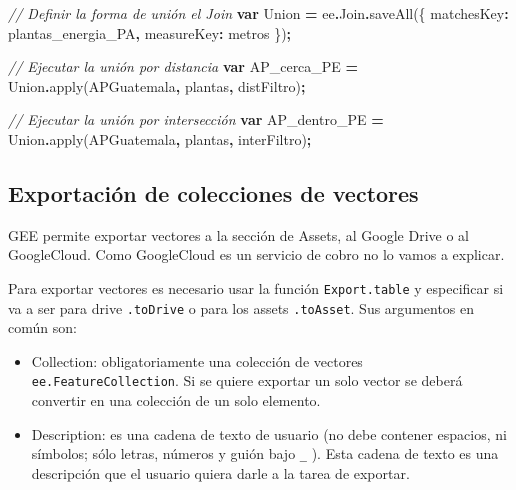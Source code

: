\documentclass[
  12pt,
  letterpaper,
  twoside]{book}
\newenvironment{Shaded}{\begin{snugshade}}{\end{snugshade}}
\newcommand{\AttributeTok}[1]{\textcolor[rgb]{0.77,0.63,0.00}{#1}}
\newcommand{\CommentTok}[1]{\textcolor[rgb]{0.56,0.35,0.01}{\textit{#1}}}
\newcommand{\DataTypeTok}[1]{\textcolor[rgb]{0.13,0.29,0.53}{#1}}
\newcommand{\FunctionTok}[1]{\textcolor[rgb]{0.00,0.00,0.00}{#1}}
\newcommand{\KeywordTok}[1]{\textcolor[rgb]{0.13,0.29,0.53}{\textbf{#1}}}
\newcommand{\NormalTok}[1]{#1}
\newcommand{\OperatorTok}[1]{\textcolor[rgb]{0.81,0.36,0.00}{\textbf{#1}}}
\newcommand{\StringTok}[1]{\textcolor[rgb]{0.31,0.60,0.02}{#1}}
\providecommand{\tightlist}{%
  \setlength{\itemsep}{0pt}\setlength{\parskip}{0pt}}
\begin{document}
\begin{Shaded}
\begin{Highlighting}[]
\CommentTok{// Definir la forma de unión el Join}
\KeywordTok{var}\NormalTok{ Union }\OperatorTok{=}\NormalTok{ ee}\OperatorTok{.}\AttributeTok{Join}\OperatorTok{.}\FunctionTok{saveAll}\NormalTok{(\{}
  \DataTypeTok{matchesKey}\OperatorTok{:} \StringTok{\textquotesingle{}plantas\_energia\_PA\textquotesingle{}}\OperatorTok{,}
  \DataTypeTok{measureKey}\OperatorTok{:} \StringTok{\textquotesingle{}metros\textquotesingle{}}
\NormalTok{\})}\OperatorTok{;}

\CommentTok{// Ejecutar la unión por distancia}
\KeywordTok{var}\NormalTok{ AP\_cerca\_PE }\OperatorTok{=}\NormalTok{ Union}\OperatorTok{.}\FunctionTok{apply}\NormalTok{(APGuatemala}\OperatorTok{,}\NormalTok{ plantas}\OperatorTok{,}\NormalTok{ distFiltro)}\OperatorTok{;}

\CommentTok{// Ejecutar la unión por intersección}
\KeywordTok{var}\NormalTok{ AP\_dentro\_PE }\OperatorTok{=}\NormalTok{ Union}\OperatorTok{.}\FunctionTok{apply}\NormalTok{(APGuatemala}\OperatorTok{,}\NormalTok{ plantas}\OperatorTok{,}\NormalTok{ interFiltro)}\OperatorTok{;}
\end{Highlighting}
\end{Shaded}

\hypertarget{exportaciuxf3n-de-colecciones-de-vectores}{%
\subsection{Exportación de colecciones de vectores}\label{exportaciuxf3n-de-colecciones-de-vectores}}

GEE permite exportar vectores a la sección de Assets, al Google Drive o al GoogleCloud. Como GoogleCloud es un servicio de cobro no lo vamos a explicar.

Para exportar vectores es necesario usar la función \texttt{Export.table} y especificar si va a ser para drive \texttt{.toDrive} o para los assets \texttt{.toAsset}. Sus argumentos en común son:

\begin{itemize}
\tightlist
\item
  Collection: obligatoriamente una colección de vectores \texttt{ee.FeatureCollection}. Si se quiere exportar un solo vector se deberá convertir en una colección de un solo elemento.
\item
  Description: es una cadena de texto de usuario (no debe contener espacios, ni símbolos; sólo letras, números y guión bajo \texttt{\_} ). Esta cadena de texto es una descripción que el usuario quiera darle a la tarea de exportar.
\end{itemize}
\end{document}

